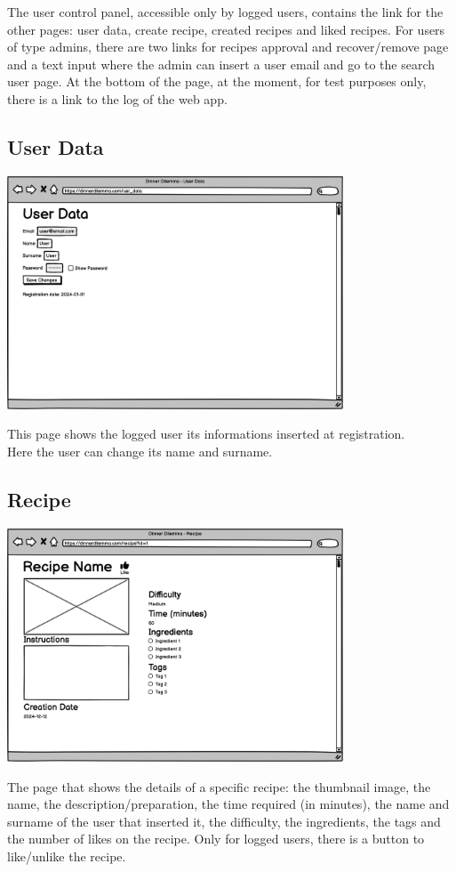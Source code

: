 The user control panel, accessible only by logged users, contains the link for the other pages: user data, create recipe, created recipes and liked recipes. For users of type admins, there are two links for recipes approval and recover/remove page and a text input where the admin can insert a user email and go to the search user page.
At the bottom of the page, at the moment, for test purposes only, there is a link to the log of the web app.

\subsection{User Data}
\includegraphics[width=0.75\textwidth]{images/userdata.png}

This page shows the logged user its informations inserted at registration.\\ Here the user can change its name and surname.

\subsection{Recipe}
\includegraphics[width=0.75\textwidth]{images/recipe.png}

The page that shows the details of a specific recipe: the thumbnail image, the name, the description/preparation, the time required (in minutes), the name and surname of the user that inserted it, the difficulty, the ingredients, the tags and the number of likes on the recipe. Only for logged users, there is a button to like/unlike the recipe.

